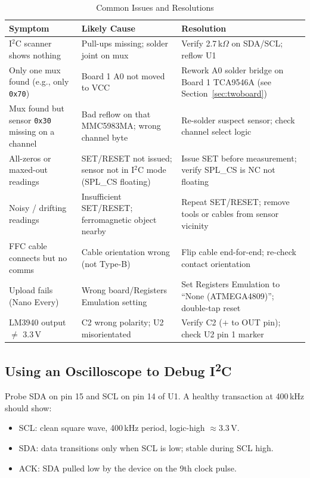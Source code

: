 \documentclass[12pt]{article}
\begin{document}
\begin{table}[H]
  \centering
  \caption{Common Issues and Resolutions}
  \begin{tabular}{p{3.8cm} p{4.2cm} p{5cm}}
    \toprule
    \textbf{Symptom} & \textbf{Likely Cause} & \textbf{Resolution} \\
    \midrule
    I$^2$C scanner shows nothing
      & Pull-ups missing; solder joint on mux
      & Verify 2.7\,k$\Omega$ on SDA/SCL; reflow U1 \\
    \addlinespace
    Only one mux found (e.g., only \texttt{0x70})
      & Board 1 A0 not moved to VCC
      & Rework A0 solder bridge on Board 1 TCA9546A (see Section~\ref{sec:twoboard}) \\
    \addlinespace
    Mux found but sensor \texttt{0x30} missing on a channel
      & Bad reflow on that MMC5983MA; wrong channel byte
      & Re-solder suspect sensor; check channel select logic \\
    \addlinespace
    All-zeros or maxed-out readings
      & SET/RESET not issued; sensor not in I$^2$C mode (SPL\_CS floating)
      & Issue SET before measurement; verify SPL\_CS is NC not floating \\
    \addlinespace
    Noisy / drifting readings
      & Insufficient SET/RESET; ferromagnetic object nearby
      & Repeat SET/RESET; remove tools or cables from sensor vicinity \\
    \addlinespace
    FFC cable connects but no comms
      & Cable orientation wrong (not Type-B)
      & Flip cable end-for-end; re-check contact orientation \\
    \addlinespace
    Upload fails (Nano Every)
      & Wrong board/Registers Emulation setting
      & Set Registers Emulation to ``None (ATMEGA4809)''; double-tap reset \\
    \addlinespace
    LM3940 output $\neq$ 3.3\,V
      & C2 wrong polarity; U2 misorientated
      & Verify C2 ($+$ to OUT pin); check U2 pin 1 marker \\
    \bottomrule
  \end{tabular}
  \label{tab:troubleshoot}
\end{table}

\subsection{Using an Oscilloscope to Debug I\textsuperscript{2}C}

Probe SDA on pin 15 and SCL on pin 14 of U1. A healthy transaction at
400\,kHz should show:
\begin{itemize}
  \item SCL: clean square wave, 400\,kHz period, logic-high $\approx3.3\,\text{V}$.
  \item SDA: data transitions only when SCL is low; stable during SCL high.
  \item ACK: SDA pulled low by the device on the 9th clock pulse.
\end{itemize}
\end{document}
